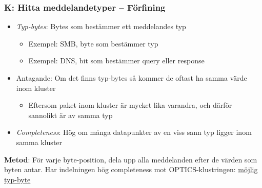 \documentclass[xetex, 8pt]{beamer}
\begin{document}
    \begin{frame}
        \frametitle{K: Hitta meddelandetyper -- Förfining}
        \begin{itemize}
            \item \emph{Typ-bytes}: Bytes som bestämmer ett meddelandes typ \\
                \begin{itemize}
                    \item Exempel: SMB, byte som bestämmer typ
                    \item Exempel: DNS, bit som bestämmer query eller response
                \end{itemize}
            \item Antagande: Om det finns typ-bytes så kommer de oftast ha
                samma värde inom kluster \\
                \begin{itemize}
                    \item Eftersom paket inom kluster är mycket lika varandra,
                        och därför sannolikt är av samma typ
                \end{itemize}
            \item \emph{Completeness}: Hög om många datapunkter av en viss
                sann typ ligger inom samma kluster
        \end{itemize}
        \vskip20pt
        \textbf{Metod}: För varje byte-position, dela upp alla meddelanden
        efter de värden som byten antar. Har indelningen hög completeness mot
        OPTICS-klustringen: \underline{möjlig typ-byte}
    \end{frame}
\end{document}
